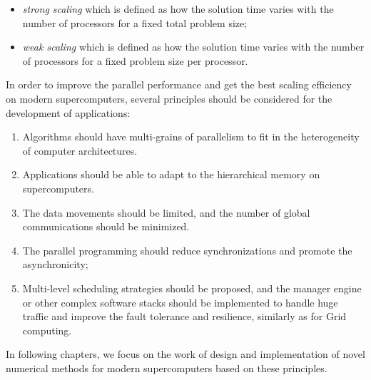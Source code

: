 \begin{itemize}
	\item  \textit{strong scaling} which is defined as how the solution time varies with the number of processors for a fixed total problem size;
	\item \textit{weak scaling} which is defined as how the solution time varies with the number of processors for a fixed problem size per processor.
\end{itemize}

In order to improve the parallel performance and get the best scaling efficiency on modern supercomputers, several principles should be considered for the development of applications:

\begin{enumerate}
	\item Algorithms should have multi-grains of parallelism to fit in the heterogeneity of computer architectures.
	\item Applications should be able to adapt to the hierarchical memory on supercomputers.
	\item The data movements should be limited, and the number of global communications should be minimized.
	\item The parallel programming should reduce synchronizations and promote the asynchronicity;
	\item Multi-level scheduling strategies should be proposed,  and the manager engine or other complex software stacks should be implemented to handle huge traffic and improve the fault tolerance and resilience, similarly as for Grid computing.
\end{enumerate}

In following chapters, we focus on the work of design and implementation of novel numerical methods for modern supercomputers based on these principles.

\clearemptydoublepage